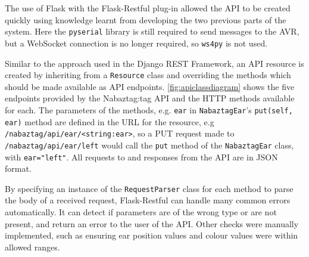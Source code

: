 \documentclass[12pt, a4paper]{article}
\begin{document}
	The use of Flask with the Flask-Restful plug-in allowed the \ac{API} to be created quickly using knowledge learnt from developing the two previous parts of the system. Here the \verb+pyserial+ library is still required to send messages to the AVR, but a WebSocket connection is no longer required, so \verb+ws4py+ is not used.
	
	Similar to the approach used in the Django \ac{REST} Framework, an \ac{API} resource is created by inheriting from a \verb+Resource+ class and overriding the methods which should be made available as \ac{API} endpoints. \autoref{fig:apiclassdiagram} shows the five endpoints provided by the Nabaztag:tag \ac{API} and the \ac{HTTP} methods available for each. The parameters of the methods, e.g. \verb+ear+ in \verb+NabaztagEar+'s \verb+put(self, ear)+ method are defined in the \ac{URL} for the resource, e.g \verb+/nabaztag/api/ear/<string:ear>+, so a PUT request made to \verb+/nabaztag/api/ear/left+ would call the \verb+put+ method of the \verb+NabaztagEar+ class, with \verb+ear="left"+. All requests to and responses from the \ac{API} are in \ac{JSON} format.
	
	By specifying an instance of the \verb+RequestParser+ class for each method to parse the body of a received request, Flask-Restful can handle many common errors automatically. It can detect if parameters are of the wrong type or are not present, and return an error to the user of the \ac{API}. Other checks were manually implemented, such as ensuring ear position values and colour values were within allowed ranges.
	
\end{document}
